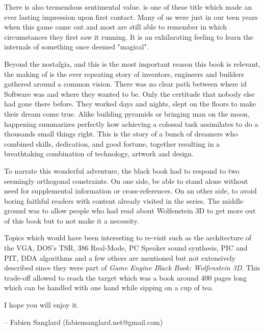  \par
There is also tremendous sentimental value. \doom{} is one of these title which made an ever lasting impression upon first contact. Many of us were just in our teen years when this game came out and most are still able to remember in which circumstances they first saw it running. It is an exhilarating feeling to learn the internals of something once deemed "magical".\\
\par


Beyond the nostalgia, and this is the most important reason this book is relevant, the making of \doom{} is the ever repeating story of inventors, engineers and builders gathered around a common vision. There was no clear path between where id Software was and where they wanted to be. Only the certitude that nobody else had gone there before. They worked days and nights, slept on the floors to make their dream come true. Alike building pyramids or bringing man on the moon, \doom{} happening summarizes perfectly how achieving a colossal task assimilates to do a thousands small things right. This is the story of a bunch of dreamers who combined skills, dedication, and good fortune, together resulting in a breathtaking combination of technology, artwork and design.\\
\par



 To narrate this wonderful adventure, the black book had to respond to two seemingly orthogonal constraints. On one side,  be able to stand alone without need for supplemental information or cross-references. On an other side, to avoid boring faithful readers with content already visited in the series. The middle ground was to allow people who had read about Wolfenstein 3D to get more out of this book but to not make it a necessity.\\
 \par
 Topics which would have been interesting to re-visit such as the architecture of the VGA, DOS's TSR, 386 Real-Mode, PC Speaker sound synthesis, PIC and PIT, DDA algorithms and a few others are mentioned but not extensively described since they were part of \textit{Game Engine Black Book: Wolfenstein 3D}. This trade-off allowed to reach the target which was a book around 400 pages long which can be handled with one hand while sipping on a cup of tea.\\
\par
I hope you will enjoy it.\\
\par
-- Fabien Sanglard (fabiensanglard.net@gmail.com)
